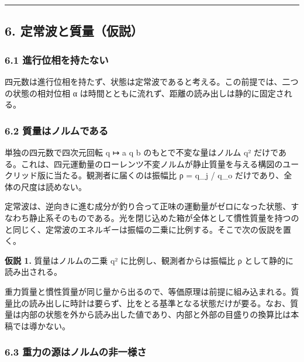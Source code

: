 \documentclass[
  a4paper,
]{ltjsarticle}
\begin{document}
\begin{center}\rule{0.5\linewidth}{0.5pt}\end{center}

\subsection{6.
定常波と質量（仮説）}\label{ux5b9aux5e38ux6ce2ux3068ux8ceaux91cfux4eeeux8aac}

\subsubsection{6.1
進行位相を持たない}\label{ux9032ux884cux4f4dux76f8ux3092ux6301ux305fux306aux3044}

四元数は進行位相を持たず、状態は定常波であると考える。この前提では、二つの状態の相対位相
α は時間とともに流れず、距離の読み出しは静的に固定される。

\subsubsection{6.2
質量はノルムである}\label{ux8ceaux91cfux306fux30ceux30ebux30e0ux3067ux3042ux308b}

単独の四元数で四次元回転 q ↦ a q b のもとで不変な量はノルム
\textbar q\textbar²
だけである。これは、四元運動量のローレンツ不変ノルムが静止質量を与える構図のユークリッド版に当たる。観測者に届くのは振幅比
ρ = \textbar q\_j\textbar{} / \textbar q\_o\textbar{}
だけであり、全体の尺度は読めない。

定常波は、逆向きに進む成分が釣り合って正味の運動量がゼロになった状態、すなわち静止系そのものである。光を閉じ込めた箱が全体として慣性質量を持つのと同じく、定常波のエネルギーは振幅の二乗に比例する。そこで次の仮説を置く。

\textbf{仮説 1.} 質量はノルムの二乗 \textbar q\textbar²
に比例し、観測者からは振幅比 ρ として静的に読み出される。

重力質量と慣性質量が同じ量から出るので、等価原理は前提に組み込まれる。質量比の読み出しに時計は要らず、比をとる基準となる状態だけが要る。なお、質量は内部の状態を外から読み出した値であり、内部と外部の目盛りの換算比は本稿では導かない。

\subsubsection{6.3
重力の源はノルムの非一様さ}\label{ux91cdux529bux306eux6e90ux306fux30ceux30ebux30e0ux306eux975eux4e00ux69d8ux3055}
\end{document}
